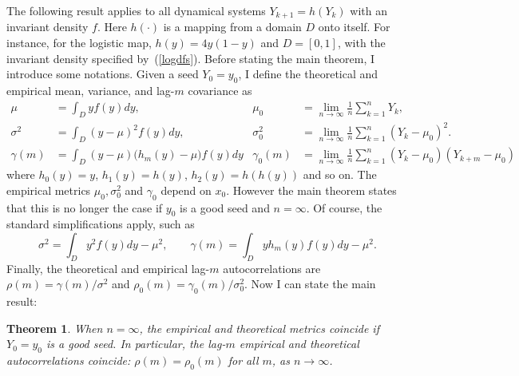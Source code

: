 \documentclass[oneside,10pt]{book}
\newtheorem{theorem}{Theorem}[section]
\begin{document}
The following result applies to all dynamical systems $Y_{k+1} = h(Y_k)$ with an invariant density $f$.  Here $h(\cdot)$ is a mapping from a domain $D$ onto itself. For instance, for the logistic map, $h(y)=4y(1-y)$ and $D=[0, 1]$, with the invariant density
 specified by~(\ref{logdfs}). Before stating the main theorem, I introduce some notations. Given a seed $Y_0=y_0$,
I define the theoretical and empirical mean, variance, and lag-$m$ covariance  as
\begin{align}
 \mu  & =  \int_D y f(y)dy,                    & \mu_0  & =  \lim_{n\rightarrow\infty} \frac{1}{n}\sum_{k=1}^n Y_k, \nonumber \\
\sigma^2  & =  \int_D(y-\mu)^2f(y)dy,  & \sigma_0^2  & =  \lim_{n\rightarrow\infty} \frac{1}{n}\sum_{k=1}^n (Y_k -\mu_0)^2. \nonumber \\
\gamma(m) & =\int_D (y-\mu) \Big(h_m(y)-\mu\Big)f(y)dy & \gamma_0(m) & = \lim_{n\rightarrow\infty} \frac{1}{n}\sum_{k=1}^n (Y_k -\mu_0)(Y_{k+m}-\mu_0) \nonumber \nonumber
\end{align}
where $h_0(y)=y$, $h_1(y)=h(y)$, $h_2(y)=h(h(y))$ and  so on.  The
 empirical metrics $\mu_0,\sigma^2_0$ and $\gamma_0$ depend on $x_0$. However the main theorem states that this is no longer the case
 if $y_0$ is a \textcolor{index}{good seed} and $n=\infty$. Of course, the standard simplifications apply, such as
$$
\sigma^2   =  \int_D y^2f(y)dy - \mu^2, \quad\quad  \gamma(m)  =\int_D y h_m(y) f(y)dy -\mu^2.
$$
Finally, the theoretical and empirical lag-$m$ autocorrelations are
$\rho(m)=\gamma(m)/\sigma^2$ and  $\rho_0(m)=\gamma_0(m)/\sigma_0^2$. Now I can state the main result:

\begin{theorem}\label{vgfd}
When $n=\infty$, the empirical and theoretical metrics coincide if $Y_0=y_0$ is a good seed. In particular, the lag-$m$ empirical and theoretical autocorrelations coincide: $\rho(m)=\rho_0(m)$ for all $m$, as $n\rightarrow\infty$.
\end{theorem}
\end{document}
